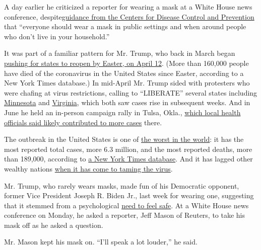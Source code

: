A day earlier he criticized a reporter for wearing a mask at a White
House news conference,
despite\href{https://www.cdc.gov/coronavirus/2019-ncov/prevent-getting-sick/prevention.html}{guidance
from the Centers for Disease Control and Prevention} that ``everyone
should wear a mask in public settings and when around people who don't
live in your household.''

It was part of a familiar pattern for Mr. Trump, who back in March began
\href{https://www.nytimes3xbfgragh.onion/2020/03/24/us/politics/trump-coronavirus-easter.html}{pushing
for states to reopen by Easter, on April 12}. (More than 160,000 people
have died of the coronavirus in the United States since Easter,
according to a New York Times database.) In mid-April Mr. Trump sided
with protesters who were chafing at virus restrictions, calling to
``LIBERATE'' several states including
\href{https://twitter.com/realDonaldTrump/status/1251168994066944003}{Minnesota}
and
\href{https://twitter.com/realDonaldTrump/status/1251169987110330372}{Virginia},
which both saw cases rise in subsequent weeks. And in June he held an
in-person campaign rally in Tulsa, Okla.,
\href{https://www.nytimes3xbfgragh.onion/2020/07/08/us/politics/coronavirus-tulsa-trump-rally.html}{which
local health officials said likely contributed to more cases} there.

The outbreak in the United States is one of
\href{https://www.nytimes3xbfgragh.onion/interactive/2020/world/coronavirus-maps.html}{the
worst in the world}: it has the most reported total cases, more 6.3
million, and the most reported deaths, more than 189,000, according to
\href{https://www.nytimes3xbfgragh.onion/interactive/2020/us/coronavirus-us-cases.html}{a
New York Times database}. And it has lagged other wealthy nations
\href{https://www.nytimes3xbfgragh.onion/2020/08/06/us/coronavirus-us.html}{when
it has come to taming the virus}.

Mr. Trump, who rarely wears masks, made fun of his Democratic opponent,
former Vice President Joseph R. Biden Jr., last week for wearing one,
suggesting that it stemmed from a psychological
\href{https://www.nytimes3xbfgragh.onion/live/2020/09/03/us/trump-vs-biden\#at-a-latrobe-pa-rally-trump-boasts-of-getting-along-with-russia}{need
to feel safe}. At a White House news conference on Monday, he asked a
reporter, Jeff Mason of Reuters, to take his mask off as he asked a
question.

Mr. Mason kept his mask on. ``I'll speak a lot louder,'' he said.

